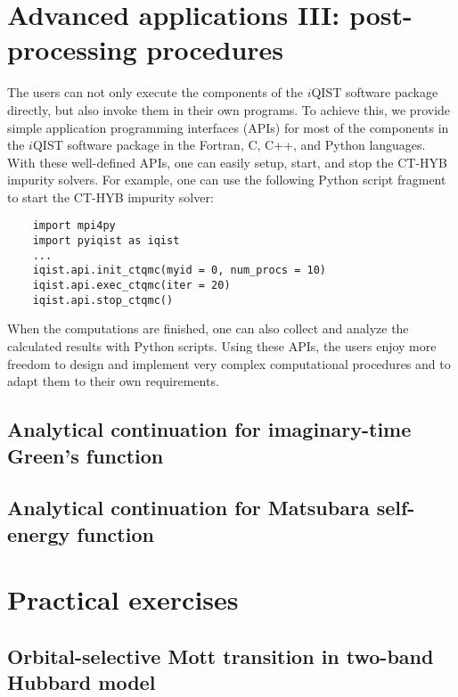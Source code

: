 \section{Advanced applications III: post-processing procedures}
The users can not only execute the components of the $i$QIST software package directly, but also invoke them in their own programs. To achieve this, we provide simple application programming interfaces (APIs) for most of the components in the $i$QIST software package in the Fortran, C, C++, and Python languages. With these well-defined APIs, one can easily setup, start, and stop the CT-HYB impurity solvers. For example, one can use the following Python script fragment to start the CT-HYB impurity solver:
\begin{verbatim}
    import mpi4py
    import pyiqist as iqist
    ...
    iqist.api.init_ctqmc(myid = 0, num_procs = 10)
    iqist.api.exec_ctqmc(iter = 20)
    iqist.api.stop_ctqmc()
\end{verbatim}
When the computations are finished, one can also collect and analyze the calculated results with Python scripts. Using these APIs, the users enjoy more freedom to design and implement very complex computational procedures and to adapt them to their own requirements.
\subsection{Analytical continuation for imaginary-time Green's function}
\subsection{Analytical continuation for Matsubara self-energy function}

\section{Practical exercises}
\subsection{Orbital-selective Mott transition in two-band Hubbard model}
